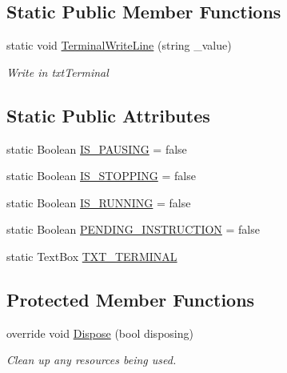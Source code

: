 \subsection*{Static Public Member Functions}
\begin{DoxyCompactItemize}
\item 
static void \mbox{\hyperlink{class_krop_1_1_control_window_1_1_form_control_window_ad4a2df546b92af668c27a51dd34ff742}{Terminal\+Write\+Line}} (string \+\_\+value)
\begin{DoxyCompactList}\small\item\em Write in txt\+Terminal \end{DoxyCompactList}\end{DoxyCompactItemize}
\subsection*{Static Public Attributes}
\begin{DoxyCompactItemize}
\item 
static Boolean \mbox{\hyperlink{class_krop_1_1_control_window_1_1_form_control_window_a7f70ff208833a41e5ee46e885106c760}{I\+S\+\_\+\+P\+A\+U\+S\+I\+NG}} = false
\item 
static Boolean \mbox{\hyperlink{class_krop_1_1_control_window_1_1_form_control_window_a869d7fc6bad7daa7c17b54451ea095a3}{I\+S\+\_\+\+S\+T\+O\+P\+P\+I\+NG}} = false
\item 
static Boolean \mbox{\hyperlink{class_krop_1_1_control_window_1_1_form_control_window_a304e98ecb96cc411a13eb2e8c24927e9}{I\+S\+\_\+\+R\+U\+N\+N\+I\+NG}} = false
\item 
static Boolean \mbox{\hyperlink{class_krop_1_1_control_window_1_1_form_control_window_a129f6c5eea061453561be894ece0342c}{P\+E\+N\+D\+I\+N\+G\+\_\+\+I\+N\+S\+T\+R\+U\+C\+T\+I\+ON}} = false
\item 
static Text\+Box \mbox{\hyperlink{class_krop_1_1_control_window_1_1_form_control_window_a107b67a284d28a7540f4f2adc40d6ec8}{T\+X\+T\+\_\+\+T\+E\+R\+M\+I\+N\+AL}}
\end{DoxyCompactItemize}
\subsection*{Protected Member Functions}
\begin{DoxyCompactItemize}
\item 
override void \mbox{\hyperlink{class_krop_1_1_control_window_1_1_form_control_window_ae6a4c484c02d89dc7707644f20123fe4}{Dispose}} (bool disposing)
\begin{DoxyCompactList}\small\item\em Clean up any resources being used. \end{DoxyCompactList}\end{DoxyCompactItemize}


